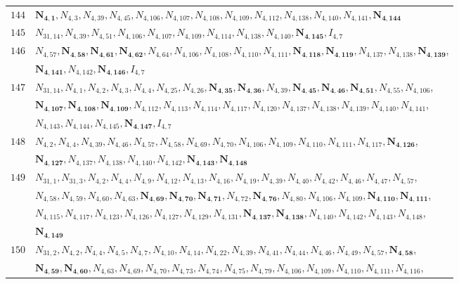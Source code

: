 \documentclass{amsart}
\theoremstyle{plain}
\theoremstyle{definition}
\theoremstyle{remark}
\begin{document}
{\begin{longtable}{ll}
$144$ & $\bm{N_{4,1}}, N_{4,3}, N_{4,39}, N_{4,45}, N_{4,106}, N_{4,107}, N_{4,108}, N_{4,109}, N_{4,112}, N_{4,138}, N_{4,140}, N_{4,141}, \bm{N_{4,144}}$\\
$145$ & $N_{31,14}, N_{4,39}, N_{4,51}, N_{4,106}, N_{4,107}, N_{4,109}, N_{4,114}, N_{4,138}, N_{4,140}, \bm{N_{4,145}}, I_{4,7}$\\
$146$ & $N_{4,57}, \bm{N_{4,58}}, \bm{N_{4,61}}, \bm{N_{4,62}}, N_{4,64}, N_{4,106}, N_{4,108}, N_{4,110}, N_{4,111}, \bm{N_{4,118}}, \bm{N_{4,119}}, N_{4,137}, N_{4,138}, \bm{N_{4,139}}$,\\ 
& $\bm{N_{4,141}}, N_{4,142}, \bm{N_{4,146}}, I_{4,7}$\\
$147$ & $N_{31,14}, N_{4,1}, N_{4,2}, N_{4,3}, N_{4,4}, N_{4,25}, N_{4,26}, \bm{N_{4,35}}, \bm{N_{4,36}}, N_{4,39}, \bm{N_{4,45}}, \bm{N_{4,46}}, \bm{N_{4,51}}, N_{4,55}, N_{4,106}$,\\ 
& $\bm{N_{4,107}}, \bm{N_{4,108}}, \bm{N_{4,109}}, N_{4,112}, N_{4,113}, N_{4,114}, N_{4,117}, N_{4,120}, N_{4,137}, N_{4,138}, N_{4,139}, N_{4,140}, N_{4,141}$,\\ 
& $N_{4,143}, N_{4,144}, N_{4,145}, \bm{N_{4,147}}, I_{4,7}$\\
$148$ & $N_{4,2}, N_{4,4}, N_{4,39}, N_{4,46}, N_{4,57}, N_{4,58}, N_{4,69}, N_{4,70}, N_{4,106}, N_{4,109}, N_{4,110}, N_{4,111}, N_{4,117}, \bm{N_{4,126}}$,\\ 
& $\bm{N_{4,127}}, N_{4,137}, N_{4,138}, N_{4,140}, N_{4,142}, \bm{N_{4,143}}, \bm{N_{4,148}}$\\
$149$ & $N_{31,1}, N_{31,3}, N_{4,2}, N_{4,4}, N_{4,9}, N_{4,12}, N_{4,13}, N_{4,16}, N_{4,19}, N_{4,39}, N_{4,40}, N_{4,42}, N_{4,46}, N_{4,47}, N_{4,57}$,\\ 
& $N_{4,58}, N_{4,59}, N_{4,60}, N_{4,63}, \bm{N_{4,69}}, \bm{N_{4,70}}, \bm{N_{4,71}}, N_{4,72}, \bm{N_{4,76}}, N_{4,80}, N_{4,106}, N_{4,109}, \bm{N_{4,110}}, \bm{N_{4,111}}$,\\ 
& $N_{4,115}, N_{4,117}, N_{4,123}, N_{4,126}, N_{4,127}, N_{4,129}, N_{4,131}, \bm{N_{4,137}}, \bm{N_{4,138}}, N_{4,140}, N_{4,142}, N_{4,143}, N_{4,148}$,\\ 
& $\bm{N_{4,149}}$\\
$150$ & $N_{31,2}, N_{4,2}, N_{4,4}, N_{4,5}, N_{4,7}, N_{4,10}, N_{4,14}, N_{4,22}, N_{4,39}, N_{4,41}, N_{4,44}, N_{4,46}, N_{4,49}, N_{4,57}, \bm{N_{4,58}}$,\\ 
& $\bm{N_{4,59}}, \bm{N_{4,60}}, N_{4,63}, N_{4,69}, N_{4,70}, N_{4,73}, N_{4,74}, N_{4,75}, N_{4,79}, N_{4,106}, N_{4,109}, N_{4,110}, N_{4,111}, N_{4,116}$,\\ 

\end{longtable}}
\end{document}
